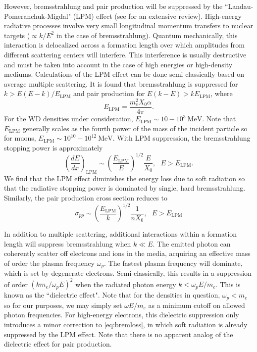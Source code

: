 \documentclass[twocolumn,showpacs,preprintnumbers,amsmath,amssymb,prd]{revtex4}
\def\r{\right)}
\def\l{\left(}
\begin{document}
\begin{appendices}
However, bremsstrahlung and pair production will be suppressed by the ``Landau-Pomeranchuk-Migdal" (LPM) effect (see \cite{LPM} for an extensive review). High-energy radiative processes involve very small longitudinal momentum transfers to nuclear targets ($\propto k/E^2$ in the case of bremsstrahlung). Quantum mechanically, this interaction is delocalized across a formation length over which amplitudes from different scattering centers will interfere. This interference is usually destructive and must be taken into account in the case of high energies or high-density mediums. Calculations of the LPM effect can be done semi-classically based on average multiple scattering. It is found that bremsstrahlung is suppressed for $k > E(E-k)/E_\text{LPM}$ and pair production for $E(k-E) > k E_\text{LPM}$, where 
\begin{equation}
\label{eq:LPM}
E_\text{LPM} = \frac{m_e^2 X_0 \alpha}{4 \pi}.
\end{equation}
For the WD densities under consideration, $E_\text{LPM} \sim 10-10^{3} ~\text{MeV}$. Note that $E_\text{LPM}$ generally scales as the fourth power of the mass of the incident particle so for muons, $E_\text{LPM} \sim 10^{10}-10^{12} ~\text{MeV}$. With LPM suppression, the bremsstrahlung stopping power is approximately
\begin{equation}
\label{eq:bremloss}
\l\frac{dE}{dx}\r_\text{LPM} \sim \l\frac{E_\text{LPM}}{E} \r^{1/2} \frac{E}{X_0}, ~~~ E>E_\text{LPM}. 
\end{equation}
We find that the LPM effect diminishes the energy loss due to soft radiation so that the radiative stopping power is dominated by single, hard bremsstrahlung. Similarly, the pair production cross section reduces to 
\begin{equation}
\sigma_{pp} \sim \l\frac{E_\text{LPM}}{k} \r^{1/2} \frac{1}{n X_0}, ~~~ E>E_\text{LPM}
\end{equation}

In addition to multiple scattering, additional interactions within a formation length will suppress bremsstrahlung when $k \ll E$. The emitted photon can coherently scatter off electrons and ions in the media, acquiring an effective mass of order the plasma frequency $\omega_p$. The fastest plasma frequency will dominate, which is set by degenerate electrons.
Semi-classically, this results in a suppression of order $(k m_e/\omega_p E)^2$ when the radiated photon energy $k < \omega_p E/m_e$. This is known as the ``dielectric effect". Note that for the densities in question, $\omega_p < m_e$ so for our purposes, we may simply set $\omega E/m_e$ as a minimum cutoff on allowed photon frequencies. For high-energy electrons, this dielectric suppression only introduces a minor correction to \eqref{eq:bremloss}, in which soft radiation is already suppressed by the LPM effect. Note that there is no apparent analog of the dielectric effect for pair production. 


\end{appendices}
\end{document}
